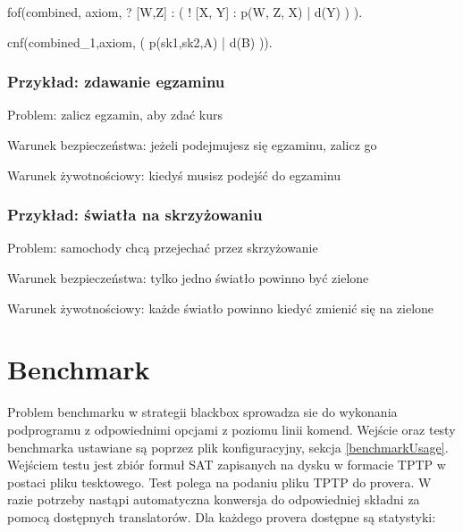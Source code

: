\documentclass[a4paper,12pt]{article}
\begin{document}

\begin{tptpcode}
fof(combined, axiom,
 ? [W,Z] : ( ! [X, Y] : p(W, Z, X)  | d(Y) )
  ).

cnf(combined_1,axiom,
    ( p(sk1,sk2,A) | d(B) )).
\end{tptpcode}

\subsubsection{Przykład: zdawanie egzaminu}

\noindent
Problem: zalicz egzamin, aby zdać kurs

\noindent
Warunek bezpieczeństwa: jeżeli podejmujesz się egzaminu, zalicz go

\noindent
Warunek żywotnościowy: kiedyś musisz podejść do egzaminu

\subsubsection{Przykład: światła na skrzyżowaniu}

\noindent
Problem: samochody chcą przejechać przez skrzyżowanie

\noindent
Warunek bezpieczeństwa: tylko jedno światło powinno być zielone

\noindent
Warunek żywotnościowy: każde światło powinno kiedyć zmienić się na zielone


\section{Benchmark}

Problem benchmarku w strategii blackbox sprowadza sie do wykonania podprogramu z odpowiednimi opcjami z poziomu linii komend.
Wejście oraz testy benchmarka ustawiane są poprzez plik konfiguracyjny, sekcja \ref{benchmarkUsage}.  Wejściem testu jest zbiór formuł \gls{SAT} zapisanych na dysku w formacie TPTP w postaci pliku tesktowego. Test polega na podaniu pliku TPTP do provera. W razie potrzeby nastąpi automatyczna konwersja do odpowiedniej składni za pomocą dostępnych translatorów.
Dla każdego provera dostępne są statystyki:
\end{document}

